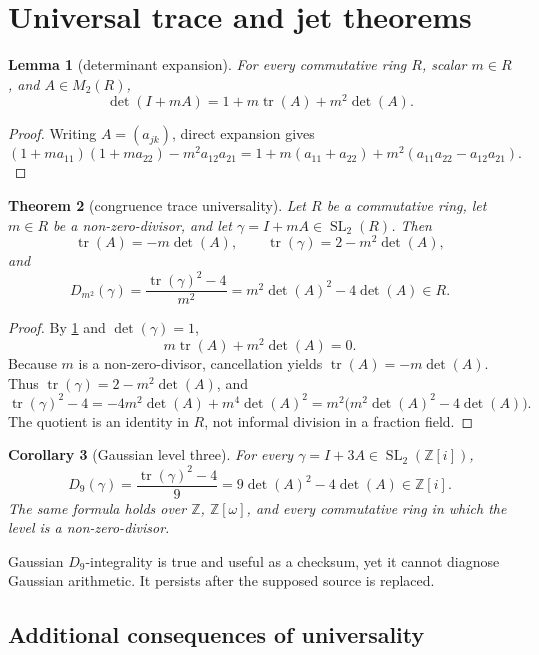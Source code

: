 \documentclass[11pt,a4paper]{article}
\newtheorem{theorem}{Theorem}[section]
\newtheorem{lemma}[theorem]{Lemma}
\newtheorem{corollary}[theorem]{Corollary}
\theoremstyle{definition}
\theoremstyle{remark}
\newcommand{\SL}{\operatorname{SL}}
\newcommand{\tr}{\operatorname{tr}}
\newcommand{\Gauss}{\mathbb{Z}[i]}
\newcommand{\Eis}{\mathbb{Z}[\omega]}
\begin{document}
\section{Universal trace and jet theorems}\label{sec:theorems}

\begin{lemma}[determinant expansion]\label{lem:detexp}
For every commutative ring \(R\), scalar \(m\in R\), and \(A\in M_2(R)\),
\[
 \det(I+mA)=1+m\tr(A)+m^2\det(A).
\]
\end{lemma}
\begin{proof}
Writing \(A=(a_{jk})\), direct expansion gives
\[
 (1+ma_{11})(1+ma_{22})-m^2a_{12}a_{21}
 =1+m(a_{11}+a_{22})+m^2(a_{11}a_{22}-a_{12}a_{21}).
\]
\end{proof}

\begin{theorem}[congruence trace universality]\label{thm:universal}
Let \(R\) be a commutative ring, let \(m\in R\) be a non-zero-divisor, and let \(\gamma=I+mA\in\SL_2(R)\). Then
\[
 \tr(A)=-m\det(A),\qquad \tr(\gamma)=2-m^2\det(A),
\]
and
\begin{equation}\label{eq:universal}
 D_{m^2}(\gamma)=\frac{\tr(\gamma)^2-4}{m^2}
 =m^2\det(A)^2-4\det(A)\in R.
\end{equation}
\end{theorem}

\begin{proof}
By \cref{lem:detexp} and \(\det(\gamma)=1\),
\[
 m\tr(A)+m^2\det(A)=0.
\]
Because \(m\) is a non-zero-divisor, cancellation yields \(\tr(A)=-m\det(A)\). Thus \(\tr(\gamma)=2-m^2\det(A)\), and
\[
 \tr(\gamma)^2-4
 =-4m^2\det(A)+m^4\det(A)^2
 =m^2\bigl(m^2\det(A)^2-4\det(A)\bigr).
\]
The quotient is an identity in \(R\), not informal division in a fraction field.
\end{proof}

\begin{corollary}[Gaussian level three]\label{cor:d9}
For every \(\gamma=I+3A\in\SL_2(\Gauss)\),
\[
 D_9(\gamma)=\frac{\tr(\gamma)^2-4}{9}=9\det(A)^2-4\det(A)\in\Gauss.
\]
The same formula holds over \(\mathbb Z\), \(\Eis\), and every commutative ring in which the level is a non-zero-divisor.
\end{corollary}

Gaussian \(D_9\)-integrality is true and useful as a checksum, yet it cannot diagnose Gaussian arithmetic. It persists after the supposed source is replaced.

\subsection{Additional consequences of universality}
\end{document}
